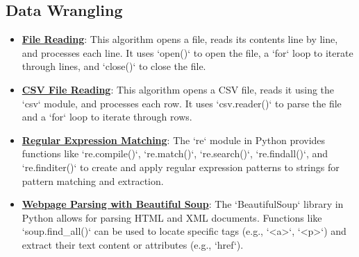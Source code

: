 \documentclass{article}%
\begin{document}
\subsection{Data Wrangling}%
\label{subsec:DataWrangling}%
\begin{itemize}[leftmargin=*]%
\item \href{https://purdue.brightspace.com/d2l/common/assets/pdfjs-d2l-dist/1.0.14-legacy/web/viewer.html?file=\%2Fcontent\%2Fenforced\%2F1095465-WL.202510.CS24200.LE1\%2F02L1-python.pdf\%3Fou\%3D1095465\&lang=en-us\&container=d2l-fileviewer-rendered-pdf\&fullscreen=d2l-fileviewer-rendered-pdf-dialog\&height=667#page=46}{\textbf{File Reading}}: This algorithm opens a file, reads its contents line by line, and processes each line. It uses `open()` to open the file, a `for` loop to iterate through lines, and `close()` to close the file.%
\item \href{https://purdue.brightspace.com/d2l/common/assets/pdfjs-d2l-dist/1.0.14-legacy/web/viewer.html?file=\%2Fcontent\%2Fenforced\%2F1095465-WL.202510.CS24200.LE1\%2F02L1-python.pdf\%3Fou\%3D1095465\&lang=en-us\&container=d2l-fileviewer-rendered-pdf\&fullscreen=d2l-fileviewer-rendered-pdf-dialog\&height=667#page=46}{\textbf{CSV File Reading}}: This algorithm opens a CSV file, reads it using the `csv` module, and processes each row. It uses `csv.reader()` to parse the file and a `for` loop to iterate through rows.%
\item \href{https://purdue.brightspace.com/d2l/common/assets/pdfjs-d2l-dist/1.0.14-legacy/web/viewer.html?file=\%2Fcontent\%2Fenforced\%2F1095465-WL.202510.CS24200.LE1\%2F05L1-parsing.pdf\%3Fou\%3D1095465\&lang=en-us\&container=d2l-fileviewer-rendered-pdf\&fullscreen=d2l-fileviewer-rendered-pdf-dialog\&height=667#page=4}{\textbf{Regular Expression Matching}}: The `re` module in Python provides functions like `re.compile()`, `re.match()`, `re.search()`, `re.findall()`, and `re.finditer()` to create and apply regular expression patterns to strings for pattern matching and extraction.%
\item \href{https://purdue.brightspace.com/d2l/common/assets/pdfjs-d2l-dist/1.0.14-legacy/web/viewer.html?file=\%2Fcontent\%2Fenforced\%2F1095465-WL.202510.CS24200.LE1\%2F05L1-parsing.pdf\%3Fou\%3D1095465\&lang=en-us\&container=d2l-fileviewer-rendered-pdf\&fullscreen=d2l-fileviewer-rendered-pdf-dialog\&height=667#page=17}{\textbf{Webpage Parsing with Beautiful Soup}}: The `BeautifulSoup` library in Python allows for parsing HTML and XML documents. Functions like `soup.find_all()` can be used to locate specific tags (e.g., `\textless{}a>`, `\textless{}p>`) and extract their text content or attributes (e.g., `href`).%
\end{itemize}
\end{document}

